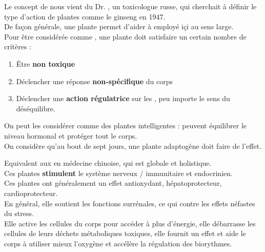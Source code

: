 
\begin{Defi}

    Le concept de  nous vient du Dr. , un toxicologue russe, 
    qui cherchait à définir le type d'action de plantes comme le ginseng en 1947.\\

    De façon générale, une plante  permet d'aider à  employé içi au sens large.\\

    Pour être considérée comme , une plante doit satisfaire un certain nombre de critères :
    \begin{enumerate}
        \item Être \textbf{non toxique}
        \item Déclencher une réponse \textbf{non-spécifique} du corps
        \item Déclencher une \textbf{action régulatrice} sur les , peu importe le sens du déséquilibre.
    \end{enumerate} 
    On peut les considérer comme des plantes intelligentes : peuvent équilibrer le niveau hormonal et protéger tout le corps.\\

    On considère qu'au bout de sept jours, une plante adaptogène doit faire de l'effet. 

    
\end{Defi}

\begin{Remarque}
    Equivalent aux  en médecine chinoise, qui est globale et holistique.\\
    Ces plantes \textbf{stimulent} le système nerveux / immunitaire et endocrinien.\\
    Ces plantes ont généralement un effet antioxydant, hépatoprotecteur, cardioprotecteur.\\
    En général, elle soutient les fonctions surrénales, ce qui contre les effets néfastes du stress.\\
    Elle active les cellules du corps pour accéder à plus d'énergie, elle débarrasse les cellules de leurs déchets métaboliques toxiques, 
    elle fournit un effet  
    et aide le corps à utiliser mieux l'oxygène et accélère la régulation des biorythmes.\\

\end{Remarque}

